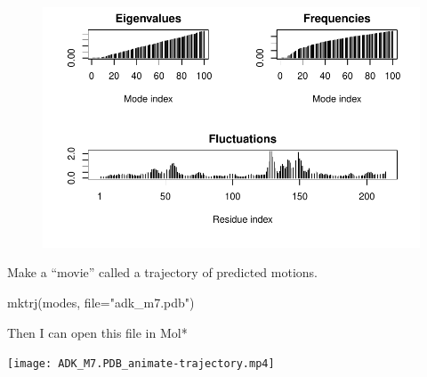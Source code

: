 \documentclass[
  letterpaper,
  DIV=11,
  numbers=noendperiod]{scrartcl}
\newenvironment{Shaded}{\begin{snugshade}}{\end{snugshade}}
\newcommand{\AttributeTok}[1]{\textcolor[rgb]{0.40,0.45,0.13}{#1}}
\newcommand{\FunctionTok}[1]{\textcolor[rgb]{0.28,0.35,0.67}{#1}}
\newcommand{\NormalTok}[1]{\textcolor[rgb]{0.00,0.23,0.31}{#1}}
\newcommand{\StringTok}[1]{\textcolor[rgb]{0.13,0.47,0.30}{#1}}
\begin{document}
\begin{figure}[H]

{\centering \includegraphics{class10_files/figure-pdf/unnamed-chunk-11-1.pdf}

}

\end{figure}

Make a ``movie'' called a trajectory of predicted motions.

\begin{Shaded}
\begin{Highlighting}[]
\FunctionTok{mktrj}\NormalTok{(modes, }\AttributeTok{file=}\StringTok{"adk\_m7.pdb"}\NormalTok{)}
\end{Highlighting}
\end{Shaded}

Then I can open this file in Mol*

\texttt{[image: ADK\_M7.PDB\_animate-trajectory.mp4]}
\end{document}
